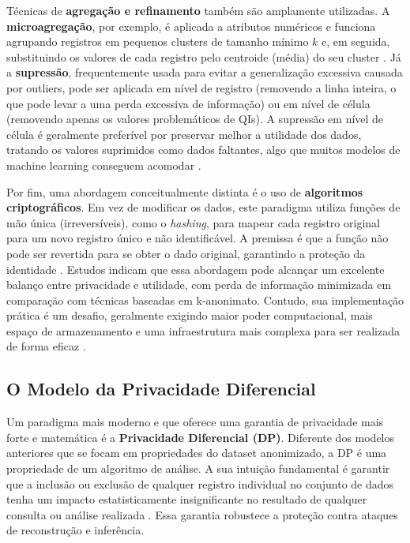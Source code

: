 Técnicas de \textbf{agregação e refinamento} também são amplamente utilizadas. A \textbf{microagregação}, por exemplo, é aplicada a atributos numéricos e funciona agrupando registros em pequenos clusters de tamanho mínimo $k$ e, em seguida, substituindo os valores de cada registro pelo centroide (média) do seu cluster \cite{Olatunji2024}. Já a \textbf{supressão}, frequentemente usada para evitar a generalização excessiva causada por outliers, pode ser aplicada em nível de registro (removendo a linha inteira, o que pode levar a uma perda excessiva de informação) ou em nível de célula (removendo apenas os valores problemáticos de QIs). A supressão em nível de célula é geralmente preferível por preservar melhor a utilidade dos dados, tratando os valores suprimidos como dados faltantes, algo que muitos modelos de machine learning conseguem acomodar \cite{Olatunji2024}.

Por fim, uma abordagem conceitualmente distinta é o uso de \textbf{algoritmos criptográficos}. Em vez de modificar os dados, este paradigma utiliza funções de mão única (irreversíveis), como o \textit{hashing}, para mapear cada registro original para um novo registro único e não identificável. A premissa é que a função não pode ser revertida para se obter o dado original, garantindo a proteção da identidade \cite{Vovk2023}. Estudos indicam que essa abordagem pode alcançar um excelente balanço entre privacidade e utilidade, com perda de informação minimizada em comparação com técnicas baseadas em k-anonimato. Contudo, sua implementação prática é um desafio, geralmente exigindo maior poder computacional, mais espaço de armazenamento e uma infraestrutura mais complexa para ser realizada de forma eficaz \cite{Vovk2023}.

\subsection{O Modelo da Privacidade Diferencial}
\label{subsec:fund-privacidade-diferencial}

Um paradigma mais moderno e que oferece uma garantia de privacidade mais forte e matemática é a \textbf{Privacidade Diferencial (DP)}. Diferente dos modelos anteriores que se focam em propriedades do dataset anonimizado, a DP é uma propriedade de um algoritmo de análise. A sua intuição fundamental é garantir que a inclusão ou exclusão de qualquer registro individual no conjunto de dados tenha um impacto estatisticamente insignificante no resultado de qualquer consulta ou análise realizada \cite{Olatunji2024}. Essa garantia robustece a proteção contra ataques de reconstrução e inferência.

